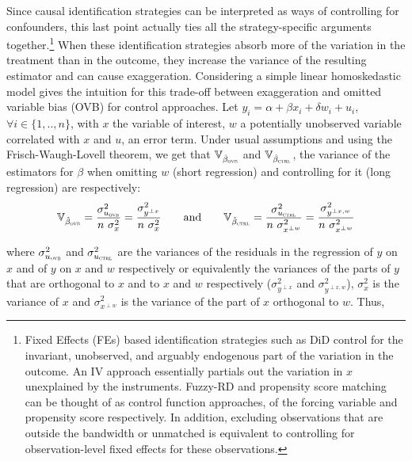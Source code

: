 			Since causal identification strategies can be interpreted as ways of controlling for confounders, this last point actually ties all the strategy-specific arguments together.\footnote{Fixed Effects (FEs) based identification strategies such as DiD control for the invariant, unobserved, and arguably endogenous part of the variation in the outcome. An IV approach essentially partials out the variation in $x$ unexplained by the instruments. %
			 Fuzzy-RD and propensity score matching can be thought of as control function approaches, of the forcing variable and propensity score respectively. In addition, excluding observations that are outside the bandwidth or unmatched is equivalent to controlling for observation-level fixed effects for these observations.} When these identification strategies absorb more of the variation in the treatment than in the outcome, they increase the variance of the resulting estimator and can cause exaggeration. 
			 Considering a simple linear homoskedastic model gives the intuition for this trade-off between exaggeration and omitted variable bias (OVB) for control approaches.  Let $y_{i} = \alpha + \beta x_{i} + \delta w_{i} + u_{i}$, $\forall i \in \{1, .., n\}$,  with $x$ the variable of interest, $w$ a potentially unobserved variable correlated with $x$ and $u$, an error term. Under usual assumptions and using the Frisch-Waugh-Lovell theorem, we get that $ \mathbb{V}_{\hat{\beta}_{\textsc{ovb}}}$ and $ \mathbb{V}_{\hat{\beta}_{\textsc{ctrl}}}$, the variance of the estimators for $\beta$ when omitting $w$ (short regression) and controlling for it (long regression) are respectively:
			~
			\[
				\mathbb{V}_{\hat{\beta}_{\textsc{ovb}}} =
				 \dfrac{\sigma^{2}_{u_{\textsc{ovb}}}}{n \ \sigma_{x}^{2}} =
				 \dfrac{\sigma^{2}_{y^{\perp x}}}{n \ \sigma_{x}^{2}}
				 \qquad \text{and} \qquad
				 \mathbb{V}_{\hat{\beta}_{\textsc{ctrl}}} = 
				 \dfrac{\sigma^{2}_{u_{\textsc{ctrl}}}}{n \ \sigma_{x^{\perp w}}^{2}} =
				  \dfrac{\sigma^{2}_{y^{\perp x, w}}}{n \ \sigma_{x^{\perp w}}^{2}}
			\]
			
			where $\sigma^{2}_{u_{\textsc{ovb}}}$ and $\sigma^{2}_{u_{\textsc{ctrl}}}$ are the variances of the residuals in the regression of $y$ on $x$ and of $y$ on $x$ and $w$ respectively or equivalently the variances of the parts of $y$ that are orthogonal to $x$ and to $x$ and $w$ respectively ($\sigma^{2}_{y^{\perp x}}$ and $\sigma^{2}_{y^{\perp x, w}}$), $\sigma^{2}_{x}$ is the variance of $x$ and $\sigma^{2}_{x^{\perp w}}$ is the variance of the part of $x$ orthogonal to $w$. Thus,
			
